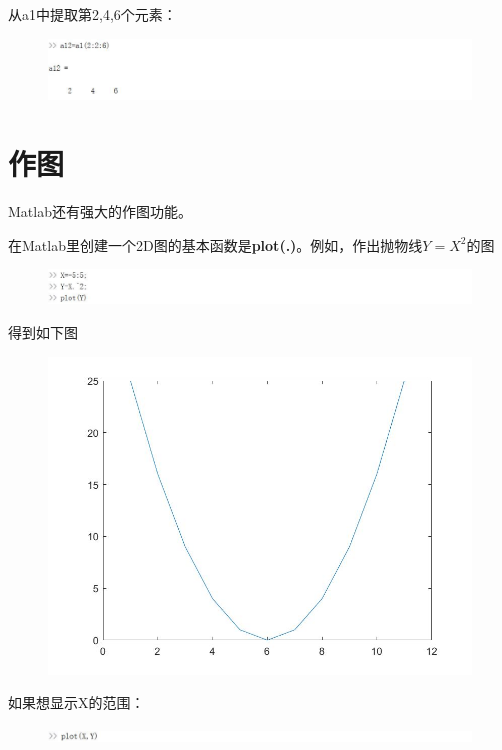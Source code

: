 \documentclass[cn,10pt,math=newtx,citestyle=gb7714-2015,bibstyle=gb7714-2015]{elegantbook}
\begin{document}
{{	从a1中提取第2,4,6个元素：
	\begin{figure}[htbp!]
		\centering
		\includegraphics[width=0.8\linewidth]{FIG/extracting2.jpg}
		\centering
	\end{figure}
	
	\section{作图}
	
	Matlab还有强大的作图功能。
	
	在Matlab里创建一个2D图的基本函数是\textbf{plot(.)}。例如，作出抛物线$Y=X^2$的图
	\begin{figure}[htbp!]
		\centering
		\includegraphics[width=0.8\linewidth]{FIG/Yplot.jpg}
		\centering
	\end{figure}
	
	得到如下图
	\begin{figure}[htbp!]
		\centering
		\includegraphics[width=0.8\linewidth]{FIG/Y.jpg}
		\centering
	\end{figure}
	
	如果想显示X的范围：
	\begin{figure}[htbp!]
		\centering
		\includegraphics[width=0.8\linewidth]{FIG/XYplot.jpg}
		\centering
	\end{figure}
	
}}
\end{document}
